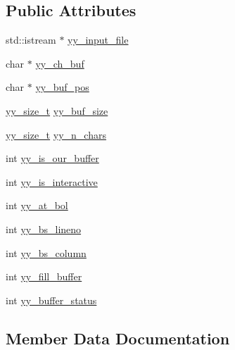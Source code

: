 \subsection*{Public Attributes}
\begin{DoxyCompactItemize}
\item 
std\+::istream $\ast$ \hyperlink{structyy__buffer__state_a394bf1c9938ce57782dc313d97770123}{yy\+\_\+input\+\_\+file}
\item 
char $\ast$ \hyperlink{structyy__buffer__state_a0d25458e69eb22207fc633a1255d099d}{yy\+\_\+ch\+\_\+buf}
\item 
char $\ast$ \hyperlink{structyy__buffer__state_a8435c3f786bbb55d21d0174e4cfc22a0}{yy\+\_\+buf\+\_\+pos}
\item 
\hyperlink{lex_8json_8cc_ad557845057f187eec4be07e2717d2afa}{yy\+\_\+size\+\_\+t} \hyperlink{structyy__buffer__state_a48302f5f3477a9c78bbddf56d356ef54}{yy\+\_\+buf\+\_\+size}
\item 
\hyperlink{lex_8json_8cc_ad557845057f187eec4be07e2717d2afa}{yy\+\_\+size\+\_\+t} \hyperlink{structyy__buffer__state_afcc44872643f513e79b43c2b1f334a67}{yy\+\_\+n\+\_\+chars}
\item 
int \hyperlink{structyy__buffer__state_a80ce2431c70dc4f89ced487f18449465}{yy\+\_\+is\+\_\+our\+\_\+buffer}
\item 
int \hyperlink{structyy__buffer__state_abf5c70eea75581b58c0ee7bd31b14490}{yy\+\_\+is\+\_\+interactive}
\item 
int \hyperlink{structyy__buffer__state_a9d60c60af6e1a6f69de16871fd64f85f}{yy\+\_\+at\+\_\+bol}
\item 
int \hyperlink{structyy__buffer__state_a818e94bc9c766e683c60df1e9fd01199}{yy\+\_\+bs\+\_\+lineno}
\item 
int \hyperlink{structyy__buffer__state_a10c4fcd8be759e6bf11e6d3e8cdb0307}{yy\+\_\+bs\+\_\+column}
\item 
int \hyperlink{structyy__buffer__state_a63d2afbb1d79a3fc63df9e12626f827d}{yy\+\_\+fill\+\_\+buffer}
\item 
int \hyperlink{structyy__buffer__state_a70fd925d37a2f0454fbd0def675d106c}{yy\+\_\+buffer\+\_\+status}
\end{DoxyCompactItemize}


\subsection{Member Data Documentation}
\mbox{\label{structyy__buffer__state_a9d60c60af6e1a6f69de16871fd64f85f}} 
